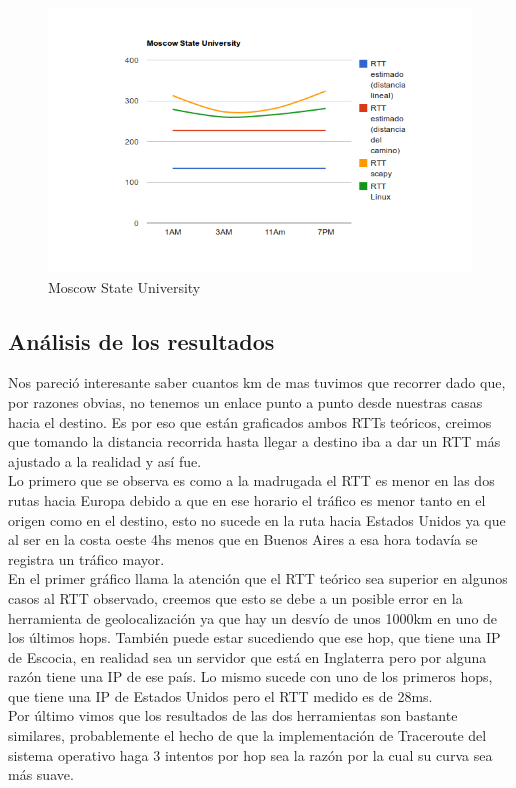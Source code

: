 \begin{figure}[h!]
    \centering
    \includegraphics[width=400pt]{msu.png}
    \caption{Moscow State University}
    \label{fig:msu:count}
\end{figure}

\subsection{Análisis de los resultados}

\indent Nos pareció interesante saber cuantos km de mas tuvimos que recorrer dado que, por razones obvias, no tenemos un enlace punto a punto desde nuestras casas hacia el destino. Es por eso que están graficados ambos RTTs teóricos, creimos que tomando la distancia recorrida hasta llegar a destino iba a dar un RTT más ajustado a la realidad y así fue.\\

\indent Lo primero que se observa es como a la madrugada el RTT es menor en las dos rutas hacia Europa debido a que en ese horario el tráfico es menor tanto en el origen como en el destino, esto no sucede en la ruta hacia Estados Unidos ya que al ser en la costa oeste 4hs menos que en Buenos Aires a esa hora todavía se registra un tráfico mayor.\\

\indent En el primer gráfico llama la atención que el RTT teórico sea superior en algunos casos al RTT observado, creemos que esto se debe a un posible error en la herramienta de geolocalización ya que hay un desvío de unos 1000km en uno de los últimos hops. También puede estar sucediendo que ese hop, que tiene una IP de Escocia, en realidad sea un servidor que está en Inglaterra pero por alguna razón tiene una IP de ese país. Lo mismo sucede con uno de los primeros hops, que tiene una IP de Estados Unidos pero el RTT medido es de 28ms.\\

\indent Por último vimos que los resultados de las dos herramientas son bastante similares, probablemente el hecho de que la implementación de Traceroute del sistema operativo haga 3 intentos por hop sea la razón por la cual su curva sea más suave.\\

